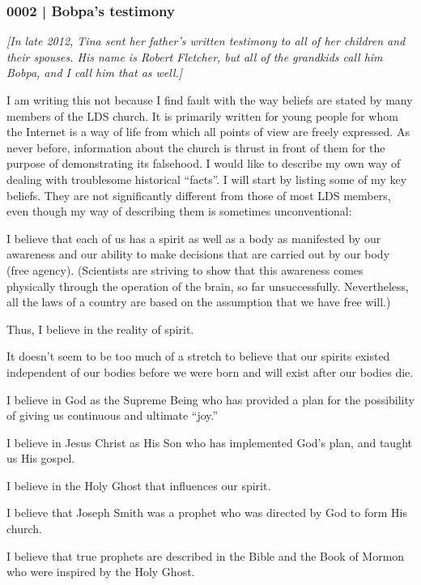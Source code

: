 		\subsubsection{0002 | Bobpa's testimony} %
			\label{GM-LIFE-SPIRITUALITY-0002}
			
			\textit{[In late 2012, Tina sent her father's written testimony to all of her children and their spouses. His name is Robert Fletcher, but all of the grandkids call him Bobpa, and I call him that as well.]}
			
			I am writing this not because I find fault with the way beliefs are stated by many members of the LDS church. It is primarily written for young people for whom the Internet is a way of life from which all points of view are freely expressed. As never before, information about the church is thrust in front of them for the purpose of demonstrating its falsehood. I would like to describe my own way of dealing with troublesome historical ``facts''. I will start by listing some of my key beliefs. They are not significantly different from those of most LDS members, even though my way of describing them is sometimes unconventional:

			I believe that each of us has a spirit as well as a body as manifested by our awareness and our ability to make decisions that are carried out by our body (free agency). (Scientists are striving to show that this awareness comes physically through the operation of the brain, so far unsuccessfully. Nevertheless, all the laws of a country are based on the assumption that we have free will.)

			Thus, I believe in the reality of spirit.

			It doesn't seem to be too much of a stretch to believe that our spirits existed independent of our bodies before we were born and will exist after our bodies die.

			I believe in God as the Supreme Being who has provided a plan for the possibility of giving us continuous and ultimate ``joy.''

			I believe in Jesus Christ as His Son who has implemented God's plan, and taught us His gospel.

			I believe in the Holy Ghost that influences our spirit.

			I believe that Joseph Smith was a prophet who was directed by God to form His church.

			I believe that true prophets are described in the Bible and the Book of Mormon who were inspired by the Holy Ghost.

